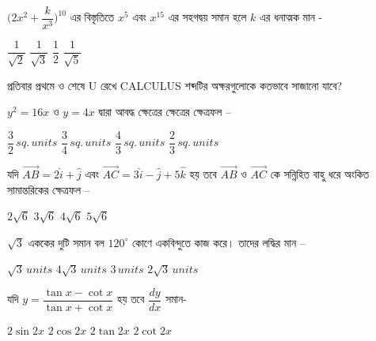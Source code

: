 \documentclass[addpoints]{exam}
\begin{document}
\begin{questions}
\question  $ \Big(2x^{2}+\dfrac{k}{x^{3}}\Big)^{10} $ এর বিস্তৃতিতে $ x^{5} $ এবং $ x^{15} $ এর সহগদ্বয় সমান হলে $ k $ এর ধনাত্মক মান -

\begin{oneparchoices}
\choice $ \dfrac{1}{\sqrt{2}} $
\choice  $ \dfrac{1}{\sqrt{3}} $
\choice $ \dfrac{1}{2} $
\choice $ \dfrac{1}{\sqrt{5}} $

\end{oneparchoices}


\question প্রতিবার প্রথমে ও শেষে U রেখে CALCULUS শব্দটির অক্ষরগুলোকে কতভাবে সাজানো যাবে?

\begin{oneparchoices}
\end{oneparchoices}

\question  $ y^{2}=16x $ ও $ y=4x $ দ্বারা আবদ্ধ ক্ষেত্রের ক্ষেত্রের ক্ষেত্রফল – 

\begin{oneparchoices}
\choice $ \dfrac{3}{2}\, sq.\, units $
\choice $ \dfrac{3}{4}\, sq.\, units $
\choice $ \dfrac{4}{3}\, sq.\, units $
\choice $ \dfrac{2}{3}\, sq.\, units $
\end{oneparchoices}

\question যদি $ \vec{AB} = 2\hat{i}+\hat{j} $ এবং $ \vec{AC} =3\hat{i}-\hat{j}+5\hat{k} $ হয় তবে $ \vec{AB} $ ও $ \vec{AC} $ কে সন্নিহিত বাহু ধরে অংকিত সামান্তরিকের ক্ষেত্রফল – 

\begin{oneparchoices}
\choice $ 2\sqrt{6} $
\choice $ 3\sqrt{6} $
\choice $ 4\sqrt{6} $
\choice  $ 5\sqrt{6} $
\end{oneparchoices}

\question $ \sqrt{3} $ এককের দুটি সমান বল $ 120^{\circ} $ কোণে একবিন্দুতে কাজ করে। তাদের লদ্ধির মান – 

\begin{oneparchoices}
\choice $ \sqrt{3}\, units $
\choice $ 4\sqrt{3}\, units $
\choice $ 3\, units $
\choice $2 \sqrt{3}\, units $
\end{oneparchoices}

\question   যদি $ y =\dfrac{\tan x-\cot x}{\tan x +\cot x} $ হয় তবে $ \dfrac{dy}{dx} $ সমান-

\begin{oneparchoices}
\choice $ 2\sin 2x $
\choice $ 2\cos 2x $
\choice $ 2\tan 2x $
\choice $ 2\cot 2x $

\end{oneparchoices}


\end{questions}
\end{document}
